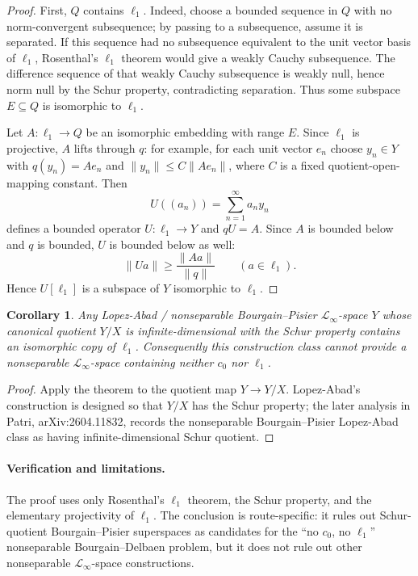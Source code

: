 \documentclass[11pt]{article}
\newtheorem*{corollary}{Corollary}
\newcommand{\linf}{\mathcal L_\infty}
\newcommand{\ellone}{\ell_1}
\newcommand{\czero}{c_0}
\begin{document}
\begin{proof}
First, \(Q\) contains \(\ellone\).  Indeed, choose a bounded sequence in \(Q\)
with no norm-convergent subsequence; by passing to a subsequence, assume it is
separated.  If this sequence had no subsequence equivalent to the unit vector
basis of \(\ellone\), Rosenthal's \(\ellone\) theorem would give a weakly
Cauchy subsequence.  The difference sequence of that weakly Cauchy subsequence
is weakly null, hence norm null by the Schur property, contradicting
separation.  Thus some subspace \(E\subseteq Q\) is isomorphic to \(\ellone\).

Let \(A:\ellone\to Q\) be an isomorphic embedding with range \(E\).  Since
\(\ellone\) is projective, \(A\) lifts through \(q\): for example, for each
unit vector \(e_n\) choose \(y_n\in Y\) with \(q(y_n)=A e_n\) and
\(\|y_n\|\le C\|A e_n\|\), where \(C\) is a fixed quotient-open-mapping
constant.  Then
\[
U((a_n))=\sum_{n=1}^\infty a_n y_n
\]
defines a bounded operator \(U:\ellone\to Y\) and \(qU=A\).  Since \(A\) is
bounded below and \(q\) is bounded, \(U\) is bounded below as well:
\[
\|U a\|\ge \frac{\|A a\|}{\|q\|}\qquad(a\in\ellone).
\]
Hence \(U[\ellone]\) is a subspace of \(Y\) isomorphic to \(\ellone\).
\end{proof}

\begin{corollary}
Any Lopez-Abad / nonseparable Bourgain--Pisier \(\linf\)-space \(Y\) whose
canonical quotient \(Y/X\) is infinite-dimensional with the Schur property
contains an isomorphic copy of \(\ellone\).  Consequently this construction
class cannot provide a nonseparable \(\linf\)-space containing neither
\(\czero\) nor \(\ellone\).
\end{corollary}

\begin{proof}
Apply the theorem to the quotient map \(Y\to Y/X\).  Lopez-Abad's construction
is designed so that \(Y/X\) has the Schur property; the later analysis in
Patri, arXiv:2604.11832, records the nonseparable Bourgain--Pisier
Lopez-Abad class as having infinite-dimensional Schur quotient.
\end{proof}

\paragraph{Verification and limitations.}
The proof uses only Rosenthal's \(\ellone\) theorem, the Schur property, and
the elementary projectivity of \(\ellone\).  The conclusion is route-specific:
it rules out Schur-quotient Bourgain--Pisier superspaces as candidates for the
``no \(\czero\), no \(\ellone\)'' nonseparable Bourgain--Delbaen problem, but
it does not rule out other nonseparable \(\linf\)-space constructions.
\end{document}
